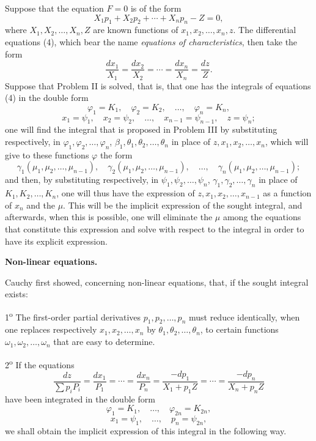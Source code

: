 \documentclass[11pt]{article}
\begin{document}
Suppose that the equation $F=0$ is of the form
\[
X_1p_1+X_2p_2+\cdots+X_np_n-Z=0,
\]
where $X_1,X_2,\ldots,X_n,Z$ are known functions of $x_1,x_2,\ldots,x_n,z$. The differential equations (4), which bear the name \emph{equations of characteristics}, then take the form
\begin{equation*}\tag{4}
\frac{dx_1}{X_1}=\frac{dx_2}{X_2}=\cdots=\frac{dx_n}{X_n}=\frac{dz}{Z}.
\end{equation*}
Suppose that Problem II is solved, that is, that one has the integrals of equations (4) in the double form
\begin{equation*}\tag{5}
\varphi_1=K_1,
\quad \varphi_2=K_2,
\quad \ldots,
\quad \varphi_n=K_n,
\end{equation*}
\begin{equation*}\tag{6}
x_1=\psi_1,
\quad x_2=\psi_2,
\quad \ldots,
\quad x_{n-1}=\psi_{n-1},
\quad z=\psi_n;
\end{equation*}
one will find the integral that is proposed in Problem III by substituting respectively, in $\varphi_1,\varphi_2,\ldots,\varphi_n$, $\beta_1,\theta_1,\theta_2,\ldots,\theta_n$ in place of $z,x_1,x_2,\ldots,x_n$, which will give to these functions $\varphi$ the form
\[
\gamma_1(\mu_1,\mu_2,\ldots,\mu_{n-1}),
\quad
\gamma_2(\mu_1,\mu_2,\ldots,\mu_{n-1}),
\quad \ldots,
\quad
\gamma_n(\mu_1,\mu_2,\ldots,\mu_{n-1});
\]
and then, by substituting respectively, in $\psi_1,\psi_2,\ldots,\psi_n$, $\gamma_1,\gamma_2,\ldots,\gamma_n$ in place of $K_1,K_2,\ldots,K_n$, one will thus have the expression of $z,x_1,x_2,\ldots,x_{n-1}$ as a function of $x_n$ and the $\mu$. This will be the implicit expression of the sought integral, and afterwards, when this is possible, one will eliminate the $\mu$ among the equations that constitute this expression and solve with respect to the integral in order to have its explicit expression.

\begin{center}
\textbf{Non-linear equations.}
\end{center}

Cauchy first showed, concerning non-linear equations, that, if the sought integral exists:

1\textsuperscript{o} The first-order partial derivatives $p_1,p_2,\ldots,p_n$ must reduce identically, when one replaces respectively $x_1,x_2,\ldots,x_n$ by $\theta_1,\theta_2,\ldots,\theta_n$, to certain functions $\omega_1,\omega_2,\ldots,\omega_n$ that are easy to determine.

2\textsuperscript{o} If the equations
\begin{equation*}\tag{4}
\frac{dz}{\sum p_iP_i}=\frac{dx_1}{P_1}=\cdots=\frac{dx_n}{P_n}=\frac{-dp_1}{X_1+p_1Z}=\cdots=\frac{-dp_n}{X_n+p_nZ}
\end{equation*}
have been integrated in the double form
\begin{equation*}\tag{5}
\varphi_1=K_1,
\quad \ldots,
\quad \varphi_{2n}=K_{2n},
\end{equation*}
\begin{equation*}\tag{6}
x_1=\psi_1,
\quad \ldots,
\quad p_n=\psi_{2n},
\end{equation*}
we shall obtain the implicit expression of this integral in the following way.
\end{document}
